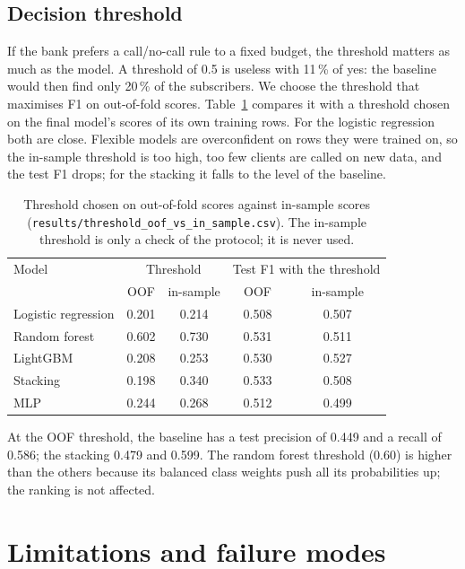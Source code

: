 \documentclass[11pt,a4paper]{article}
\begin{document}
\subsection{Decision threshold}\label{sec:threshold}
If the bank prefers a call/no-call rule to a fixed budget, the threshold matters as much as the model. A threshold of
0.5 is useless with 11\,\% of yes: the baseline would then find only 20\,\% of the subscribers. We choose the threshold
that maximises F1 on out-of-fold scores. Table~\ref{tab:thr} compares it with a threshold chosen on the final
model's scores of its own training rows. For the logistic regression both are close. Flexible models are
overconfident on rows they were trained on, so the in-sample threshold is too high, too few clients are called on new
data, and the test F1 drops; for the stacking it falls to the level of the baseline.

\begin{table}[H]
\centering\small
\begin{tabular}{l c c c c}
\toprule
Model & \multicolumn{2}{c}{Threshold} & \multicolumn{2}{c}{Test F1 with the threshold} \\
 & OOF & in-sample & OOF & in-sample \\
\midrule
Logistic regression & 0.201 & 0.214 & 0.508 & 0.507 \\
Random forest & 0.602 & 0.730 & 0.531 & 0.511 \\
LightGBM & 0.208 & 0.253 & 0.530 & 0.527 \\
Stacking & 0.198 & 0.340 & 0.533 & 0.508 \\
MLP & 0.244 & 0.268 & 0.512 & 0.499 \\
\bottomrule
\end{tabular}
\caption{Threshold chosen on out-of-fold scores against in-sample scores (\texttt{results/threshold\_oof\_vs\_in\_sample.csv}).
The in-sample threshold is only a check of the protocol; it is never used.}
\label{tab:thr}
\end{table}

At the OOF threshold, the baseline has a test precision of 0.449 and a recall of 0.586; the stacking 0.479 and 0.599.
The random forest threshold (0.60) is higher than the others because its balanced class weights push all its
probabilities up; the ranking is not affected.

\section{Limitations and failure modes}\label{sec:drift}
\end{document}
